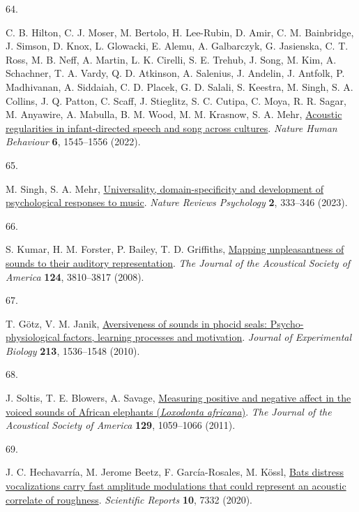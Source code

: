 \documentclass[
]{article}
\newlength{\cslhangindent}
\newlength{\csllabelwidth}
\newenvironment{CSLReferences}[2] %
 {\begin{list}{}{%
  \setlength{\itemindent}{0pt}
  \setlength{\leftmargin}{0pt}
  \setlength{\parsep}{0pt}
  \ifodd #1
   \setlength{\leftmargin}{\cslhangindent}
   \setlength{\itemindent}{-1\cslhangindent}
  \fi
  \setlength{\itemsep}{#2\baselineskip}}}
 {\end{list}}
\newcommand{\CSLLeftMargin}[1]{\parbox[t]{\csllabelwidth}{\strut#1\strut}}
\newcommand{\CSLRightInline}[1]{\parbox[t]{\linewidth - \csllabelwidth}{\strut#1\strut}}
\begin{document}
\begin{CSLReferences}{0}{0}
\CSLLeftMargin{64. }%
\CSLRightInline{C. B. Hilton, C. J. Moser, M. Bertolo, H. Lee-Rubin, D.
Amir, C. M. Bainbridge, J. Simson, D. Knox, L. Glowacki, E. Alemu, A.
Galbarczyk, G. Jasienska, C. T. Ross, M. B. Neff, A. Martin, L. K.
Cirelli, S. E. Trehub, J. Song, M. Kim, A. Schachner, T. A. Vardy, Q. D.
Atkinson, A. Salenius, J. Andelin, J. Antfolk, P. Madhivanan, A.
Siddaiah, C. D. Placek, G. D. Salali, S. Keestra, M. Singh, S. A.
Collins, J. Q. Patton, C. Scaff, J. Stieglitz, S. C. Cutipa, C. Moya, R.
R. Sagar, M. Anyawire, A. Mabulla, B. M. Wood, M. M. Krasnow, S. A.
Mehr, \href{https://doi.org/10.1038/s41562-022-01410-x}{Acoustic
regularities in infant-directed speech and song across cultures}.
\emph{Nature Human Behaviour} \textbf{6}, 1545--1556 (2022).}

\CSLLeftMargin{65. }%
\CSLRightInline{M. Singh, S. A. Mehr,
\href{https://doi.org/10.1038/s44159-023-00182-z}{Universality,
domain-specificity and development of psychological responses to music}.
\emph{Nature Reviews Psychology} \textbf{2}, 333--346 (2023).}

\CSLLeftMargin{66. }%
\CSLRightInline{S. Kumar, H. M. Forster, P. Bailey, T. D. Griffiths,
\href{https://doi.org/10.1121/1.3006380}{Mapping unpleasantness of
sounds to their auditory representation}. \emph{The Journal of the
Acoustical Society of America} \textbf{124}, 3810--3817 (2008).}

\CSLLeftMargin{67. }%
\CSLRightInline{T. Götz, V. M. Janik,
\href{https://doi.org/10.1242/jeb.035535}{Aversiveness of sounds in
phocid seals: Psycho-physiological factors, learning processes and
motivation}. \emph{Journal of Experimental Biology} \textbf{213},
1536--1548 (2010).}

\CSLLeftMargin{68. }%
\CSLRightInline{J. Soltis, T. E. Blowers, A. Savage,
\href{https://doi.org/10.1121/1.3531798}{Measuring positive and negative
affect in the voiced sounds of {African} elephants (\emph{{Loxodonta}
africana})}. \emph{The Journal of the Acoustical Society of America}
\textbf{129}, 1059--1066 (2011).}

\CSLLeftMargin{69. }%
\CSLRightInline{J. C. Hechavarría, M. Jerome Beetz, F. García-Rosales,
M. Kössl, \href{https://doi.org/10.1038/s41598-020-64323-7}{Bats
distress vocalizations carry fast amplitude modulations that could
represent an acoustic correlate of roughness}. \emph{Scientific Reports}
\textbf{10}, 7332 (2020).}


\end{CSLReferences}
\end{document}
